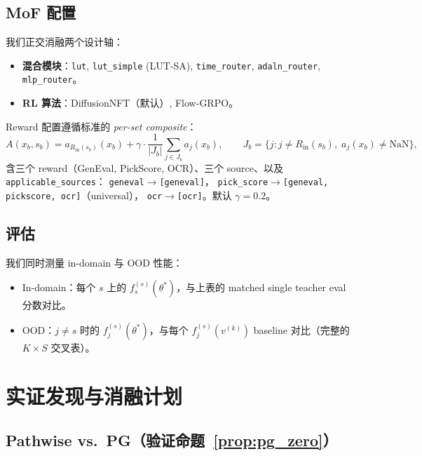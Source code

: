 \documentclass[11pt,a4paper]{article}
\theoremstyle{definition}
\begin{document}
\subsection{MoF 配置}

我们正交消融两个设计轴：
\begin{itemize}[leftmargin=1.5em]
\item \textbf{混合模块}：\texttt{lut}, \texttt{lut\_simple} (LUT-SA),
\texttt{time\_router}, \texttt{adaln\_router}, \texttt{mlp\_router}。
\item \textbf{RL 算法}：DiffusionNFT（默认）, Flow-GRPO。
\end{itemize}

Reward 配置遵循标准的 \emph{per-set composite}：
\begin{equation}
A(x_b, s_b)
= a_{R_{\text{in}}(s_b)}(x_b)
+ \gamma\cdot\frac{1}{|J_b|}\sum_{j\in J_b}a_j(x_b),\qquad
J_b = \{j: j\neq R_{\text{in}}(s_b),\;a_j(x_b)\neq\mathrm{NaN}\},
\label{eq:advantage}
\end{equation}
含三个 reward（GenEval, PickScore, OCR）、三个 source、以及
\texttt{applicable\_sources}：
\texttt{geneval}$\to$\texttt{[geneval]}，
\texttt{pick\_score}$\to$\texttt{[geneval, pickscore, ocr]}（universal），
\texttt{ocr}$\to$\texttt{[ocr]}。默认 $\gamma = 0.2$。

\subsection{评估}

我们同时测量 in-domain 与 OOD 性能：
\begin{itemize}[leftmargin=1.5em]
\item In-domain：每个 $s$ 上的 $f_s^{(s)}(\theta^*)$，与上表的 matched
single teacher eval 分数对比。
\item OOD：$j \neq s$ 时的 $f_j^{(s)}(\theta^*)$，与每个
$f_j^{(s)}(v^{(k)})$ baseline 对比（完整的 $K \times S$ 交叉表）。
\end{itemize}

\section{实证发现与消融计划}
\label{sec:exp_findings}

\subsection{Pathwise vs.\ PG（验证命题~\ref{prop:pg_zero}）}
\end{document}
